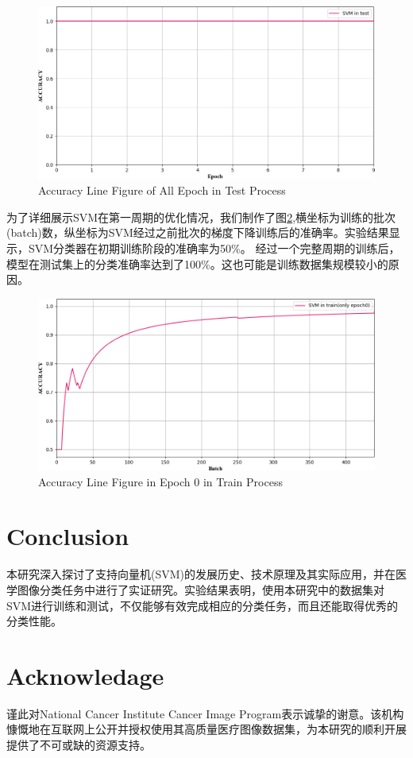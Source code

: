 \documentclass[twocolumn]{article}
\begin{document}
\begin{figure}[h]
    \centering
    \includegraphics[width=1.0\linewidth]{exp_log/train440_valid024/ACCURACY_test}
    \caption[acc_test]{Accuracy Line Figure of All Epoch in Test Process}
    \label{fig:acc_test}
\end{figure}

为了详细展示SVM在第一周期的优化情况，我们制作了图\ref{fig:acc_train_e0},横坐标为训练的批次(batch)数，纵坐标为SVM经过之前批次的梯度下降训练后的准确率。实验结果显示，SVM分类器在初期训练阶段的准确率为50\%。
经过一个完整周期的训练后，模型在测试集上的分类准确率达到了100\%。这也可能是训练数据集规模较小的原因。

\begin{figure}[h]
    \centering
    \includegraphics[width=1.0\linewidth]{exp_log/train440_valid024/ACCURACY_train_epoch0}
    \caption[acc_train_e0]{Accuracy Line Figure in Epoch 0 in Train Process}
    \label{fig:acc_train_e0}
\end{figure}

\section{Conclusion}
本研究深入探讨了支持向量机(SVM)的发展历史、技术原理及其实际应用，并在医学图像分类任务中进行了实证研究。实验结果表明，使用本研究中的数据集对SVM进行训练和测试，不仅能够有效完成相应的分类任务，而且还能取得优秀的分类性能。

\section*{Acknowledage}
谨此对National Cancer Institute Cancer Image Program表示诚挚的谢意。该机构慷慨地在互联网上公开并授权使用其高质量医疗图像数据集，为本研究的顺利开展提供了不可或缺的资源支持。



\end{document}
